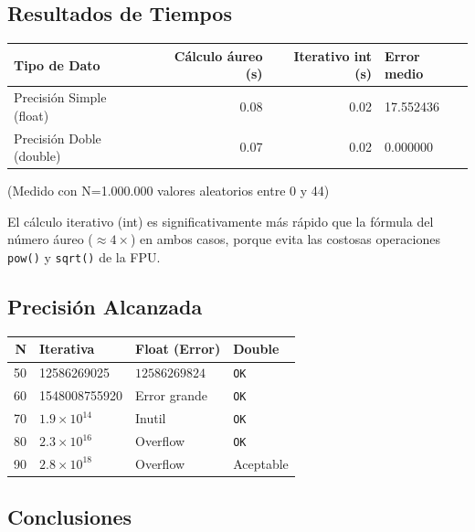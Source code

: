 \documentclass[11pt,a4paper]{article}
\begin{document}
\subsection*{Resultados de Tiempos}

\begin{center}
\begin{tabular}{|l|r|r|l|}
\hline
\textbf{Tipo de Dato} & \textbf{Cálculo áureo (s)} & \textbf{Iterativo int (s)} & \textbf{Error medio} \\
\hline
Precisión Simple (float)  & 0.08 & 0.02 & 17.552436 \\
Precisión Doble (double)  & 0.07 & 0.02 & 0.000000 \\
\hline
\end{tabular}
\end{center}

(Medido con N=1.000.000 valores aleatorios entre 0 y 44)

El cálculo iterativo (int) es significativamente más rápido que la fórmula del número áureo ($\approx 4\times$) en ambos casos, porque evita las costosas operaciones \texttt{pow()} y \texttt{sqrt()} de la FPU.

\subsection*{Precisión Alcanzada}

\begin{center}
\begin{tabular}{|r|l|l|l|}
\hline
\textbf{N} & \textbf{Iterativa} & \textbf{Float (Error)} & \textbf{Double} \\
\hline
50 & 12586269025 & $12586269824$ & \texttt{OK} \\
60 & 1548008755920 & Error grande & \texttt{OK} \\
70 & $1.9 \times 10^{14}$ & Inutil & \texttt{OK} \\
80 & $2.3 \times 10^{16}$ & Overflow & \texttt{OK} \\
90 & $2.8 \times 10^{18}$ & Overflow & Aceptable \\
\hline
\end{tabular}
\end{center}

\subsection*{Conclusiones}
\end{document}
